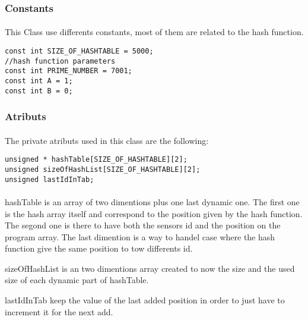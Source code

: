 \documentclass[a4paper, 12pts]{article}
\begin{document}
\subsubsection{Constants}

\paragraph{}
	This Class use differents constants, most of them are related to the hash function.

\begin{lstlisting}
const int SIZE_OF_HASHTABLE = 5000;
//hash function parameters
const int PRIME_NUMBER = 7001;
const int A = 1;
const int B = 0;
\end{lstlisting}

\subsubsection{Atributs}

\paragraph{}
	The private atributs used in this class are the following:
\begin{lstlisting}
unsigned * hashTable[SIZE_OF_HASHTABLE][2];
unsigned sizeOfHashList[SIZE_OF_HASHTABLE][2];
unsigned lastIdInTab;
\end{lstlisting}
\paragraph{}	
    hashTable is an array of two dimentions plus one last dynamic one. The first one is the hash array itself and correspond to the position given by the hash function. The segond one is there to have both the sensors id and the position on the program array. The last dimention is a way to handel case where the hash function give the same position to tow differents id.
    
    sizeOfHashList is an two dimentions array created to now the size and the used size of each dynamic part of hashTable.
    
    lastIdInTab keep the value of the last added position in order to just have to increment it for the next add.
    
\end{document}
